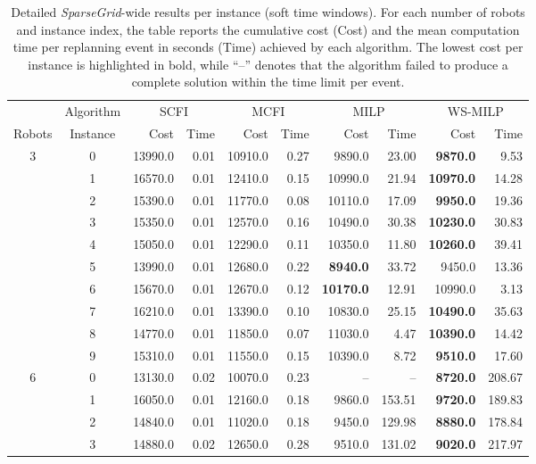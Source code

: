 {\color{red}
\begin{table}[htb!]
\centering
\caption{Detailed \textit{SparseGrid}-wide results per instance (soft time windows). For each number of robots and instance index, the table reports the cumulative cost (Cost) and the mean computation time per replanning event in seconds (Time) achieved by each algorithm. The lowest cost per instance is highlighted in bold, while ``--'' denotes that the algorithm failed to produce a complete solution within the time limit per event.}
\label{table:grid_wide_results}
\begin{tabular}{cc|rr|rr|rr|rr}
\toprule
 & Algorithm & \multicolumn{2}{c|}{SCFI} & \multicolumn{2}{c|}{MCFI} & \multicolumn{2}{c|}{MILP} & \multicolumn{2}{c}{WS-MILP} \\
Robots & Instance & Cost & Time & Cost & Time & Cost & Time & Cost & Time \\
\midrule
3 & 0 & 13990.0 & 0.01 & 10910.0 & 0.27 & 9890.0 & 23.00 & \textbf{9870.0} & 9.53 \\
 & 1 & 16570.0 & 0.01 & 12410.0 & 0.15 & 10990.0 & 21.94 & \textbf{10970.0} & 14.28 \\
 & 2 & 15390.0 & 0.01 & 11770.0 & 0.08 & 10110.0 & 17.09 & \textbf{9950.0} & 19.36 \\
 & 3 & 15350.0 & 0.01 & 12570.0 & 0.16 & 10490.0 & 30.38 & \textbf{10230.0} & 30.83 \\
 & 4 & 15050.0 & 0.01 & 12290.0 & 0.11 & 10350.0 & 11.80 & \textbf{10260.0} & 39.41 \\
 & 5 & 13990.0 & 0.01 & 12680.0 & 0.22 & \textbf{8940.0} & 33.72 & 9450.0 & 13.36 \\
 & 6 & 15670.0 & 0.01 & 12670.0 & 0.12 & \textbf{10170.0} & 12.91 & 10990.0 & 3.13 \\
 & 7 & 16210.0 & 0.01 & 13390.0 & 0.10 & 10830.0 & 25.15 & \textbf{10490.0} & 35.63 \\
 & 8 & 14770.0 & 0.01 & 11850.0 & 0.07 & 11030.0 & 4.47 & \textbf{10390.0} & 14.42 \\
 & 9 & 15310.0 & 0.01 & 11550.0 & 0.15 & 10390.0 & 8.72 & \textbf{9510.0} & 17.60 \\ \hline
6 & 0 & 13130.0 & 0.02 & 10070.0 & 0.23 & -- & -- & \textbf{8720.0} & 208.67 \\
 & 1 & 16050.0 & 0.01 & 12160.0 & 0.18 & 9860.0 & 153.51 & \textbf{9720.0} & 189.83 \\
 & 2 & 14840.0 & 0.01 & 11020.0 & 0.18 & 9450.0 & 129.98 & \textbf{8880.0} & 178.84 \\
 & 3 & 14880.0 & 0.02 & 12650.0 & 0.28 & 9510.0 & 131.02 & \textbf{9020.0} & 217.97 \\

\end{tabular}
\end{table}}
